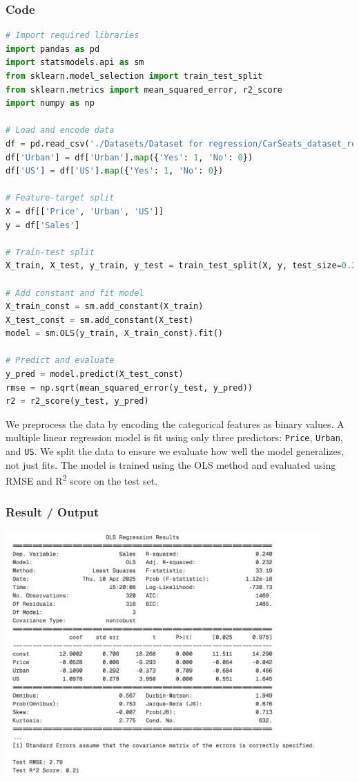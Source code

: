 \documentclass[12pt]{article}
\begin{document}
\subsubsection*{Code}
\begin{lstlisting}[language=Python]
# Import required libraries
import pandas as pd
import statsmodels.api as sm
from sklearn.model_selection import train_test_split
from sklearn.metrics import mean_squared_error, r2_score
import numpy as np

# Load and encode data
df = pd.read_csv('./Datasets/Dataset for regression/CarSeats_dataset_regression.csv')
df['Urban'] = df['Urban'].map({'Yes': 1, 'No': 0})
df['US'] = df['US'].map({'Yes': 1, 'No': 0})

# Feature-target split
X = df[['Price', 'Urban', 'US']]
y = df['Sales']

# Train-test split
X_train, X_test, y_train, y_test = train_test_split(X, y, test_size=0.2, random_state=42)

# Add constant and fit model
X_train_const = sm.add_constant(X_train)
X_test_const = sm.add_constant(X_test)
model = sm.OLS(y_train, X_train_const).fit()

# Predict and evaluate
y_pred = model.predict(X_test_const)
rmse = np.sqrt(mean_squared_error(y_test, y_pred))
r2 = r2_score(y_test, y_pred)
\end{lstlisting}

We preprocess the data by encoding the categorical features as binary values. A multiple linear regression model is fit using only three predictors: \texttt{Price}, \texttt{Urban}, and \texttt{US}. We split the data to ensure we evaluate how well the model generalizes, not just fits. The model is trained using the OLS method and evaluated using RMSE and R\textsuperscript{2} score on the test set.

\subsubsection*{Result / Output}
\begin{center}
\includegraphics[width=0.9\textwidth]{images/mlr/multiple_LR.png}
\end{center}
\end{document}

